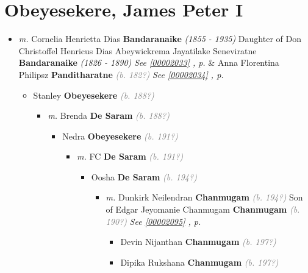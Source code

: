 \documentclass[10pt, openany]{book}
\begin{document}
\chapter{Obeyesekere, James Peter I}
\label{00002036}
\textcolor{slmaroon}{\textit{}}
\begin{itemize}
\item{\textit{m.} Cornelia Henrietta Dias \textbf{Bandaranaike} \textcolor{slorange}{\textit{(1855 - 1935)}} Daughter of  Don Christoffel Henricus Dias Abeywickrema Jayatilake Seneviratne \textbf{Bandaranaike} \textcolor{slorange}{\textit{(1826 - 1890)}} \textcolor{slteal}{\textit{See  \autoref{00002033} \textit{, p. \pageref{00002033} }}}  \&  Anna Florentina Philipsz \textbf{Panditharatne} \textcolor{gray}{\textit{(b. 182?)}} \textcolor{slteal}{\textit{See  \autoref{00002034} \textit{, p. \pageref{00002034} }}}   \label{couple:00002035:00002036} \begin{itemize}
\item{Stanley \textbf{Obeyesekere} \textcolor{gray}{\textit{(b. 188?)}}
\begin{itemize}
\item{\textit{m.} Brenda \textbf{De Saram} \textcolor{gray}{\textit{(b. 188?)}}   \label{couple:00002084:00002085} \begin{itemize}
\item{Nedra \textbf{Obeyesekere} \textcolor{gray}{\textit{(b. 191?)}}
\begin{itemize}
\item{\textit{m.} FC  \textbf{De Saram} \textcolor{gray}{\textit{(b. 191?)}}   \label{couple:00002086:00002087} \begin{itemize}
\item{Oosha \textbf{De Saram} \textcolor{gray}{\textit{(b. 194?)}}
\begin{itemize}
\item{\textit{m.} Dunkirk Neilendran \textbf{Chanmugam} \textcolor{gray}{\textit{(b. 194?)}} Son of  Edgar Jeyomanie Chanmugam \textbf{Chanmugam} \textcolor{gray}{\textit{(b. 190?)}} \textcolor{slteal}{\textit{See  \autoref{00002095} \textit{, p. \pageref{00002095} }}}   \label{couple:00002093:00002094} \begin{itemize}
\item{Devin Nijanthan \textbf{Chanmugam} \textcolor{gray}{\textit{(b. 197?)}}
  }
\item{Dipika Rukshana \textbf{Chanmugam} \textcolor{gray}{\textit{(b. 197?)}}
  }

\end{itemize}}
\end{itemize}}
\end{itemize}}
\end{itemize}}
\end{itemize}}
\end{itemize}}
\end{itemize}}
\end{itemize}
\end{document}
